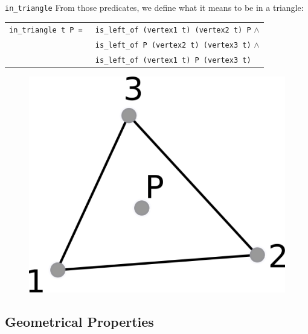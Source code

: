 \documentclass[18pt]{beamer}
\begin{document}
\begin{frame}{\tt in\_triangle}
From those predicates, we define what it means to be in a triangle:
{\small \begin{tabular}{ll}
       {\tt in\_triangle t P = }& {\tt is\_left\_of (vertex1 t) (vertex2 t) P} $\wedge$\\
        &{\tt is\_left\_of P (vertex2 t) (vertex3 t)} $\wedge$\\
  & {\tt is\_left\_of (vertex1 t) P (vertex3 t)}
      \end{tabular}}
      
       \begin{figure}
  \centering
  \includegraphics[scale=1]{intriangle}
\end{figure}

\end{frame}

\subsection{Geometrical Properties}
\end{document}
